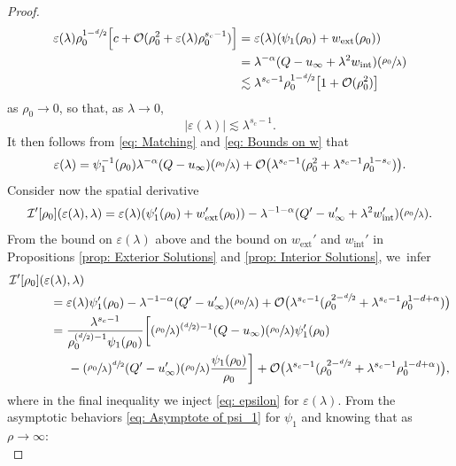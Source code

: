 \documentclass[10pt]{amsart}
\newcommand{\Psfrac}[2]{(\sfrac{#1}{#2})}
\theoremstyle{plain}
\theoremstyle{definition}
\DeclareMathOperator{\exterior}{ext}
\DeclareMathOperator{\interior}{int}
\begin{document}
\begin{proof}
\[
\begin{aligned}
\varepsilon(\lambda)\rho_0^{1-\sfrac{d}{2}}\Big[c+\mathcal O(\rho_0^2+\varepsilon(\lambda)\rho_0^{s_c-1})\Big]&= \varepsilon(\lambda)(\psi_1(\rho_0)+w_{\exterior}(\rho_0))\\
&=\lambda^{-\alpha}(Q-u_\infty+\lambda^2w_{\interior})(\sfrac{\rho_0}{\lambda})\\
&\lesssim \lambda^{s_c-1}\rho_0^{1-\sfrac{d}{2}}\big[1+\mathcal O(\rho_0^2)\big]
\end{aligned}
\]
as $\rho_0\to 0$, so that, as $\lambda\to 0$,
\[
|\varepsilon (\lambda)|\lesssim \lambda^{s_c-1}.
\]
It then follows from \eqref{eq: Matching} and \eqref{eq: Bounds on w} that
\begin{equation}
\label{eq: epsilon}
\varepsilon (\lambda) = \psi_1^{-1}(\rho_0)\lambda^{-\alpha}(Q-u_\infty )(\sfrac{\rho_0}{\lambda})+\mathcal O\big(\lambda^{s_c-1}(\rho_0^2+\lambda^{s_c-1}\rho_0^{1-s_c})\big).
\end{equation}
Consider now the spatial derivative
\[
\mathcal I'[\rho_0](\varepsilon(\lambda),\lambda)= \varepsilon(\lambda)(\psi_1'(\rho_0)+w_{\exterior}'(\rho_0))-\lambda^{-1-\alpha}(Q'-u_\infty'+\lambda^2w_{\interior}')(\sfrac{\rho_0}{\lambda}).
\]
From the bound on $\varepsilon(\lambda)$ above and the bound on $w_{\exterior}'$ and $w_{\interior}'$ in Propositions \ref{prop: Exterior Solutions} and \ref{prop: Interior Solutions}, we~infer
\[
\begin{aligned}
\mathcal I'[\rho_0](\varepsilon&(\lambda),\lambda)\\
&=\varepsilon(\lambda)\psi_1'(\rho_0)-\lambda^{-1-\alpha}(Q'-u_\infty')(\sfrac{\rho_0}{\lambda})+\mathcal O\big(\lambda^{s_c-1}(\rho_0^{2-\sfrac{d}{2}}+\lambda^{s_c-1}\rho_0^{1-d+\alpha})\big)\\
&=\frac{\lambda^{s_c-1}}{\rho_0^{\Psfrac{d}{2}-1}\psi_1(\rho_0)}\bigg[(\sfrac{\rho_0}{\lambda})^{\Psfrac{d}{2}-1}(Q-u_\infty)(\sfrac{\rho_0}{\lambda})\psi_1'(\rho_0)\\
&\hspace*{.5cm}-(\sfrac{\rho_0}{\lambda})^{\sfrac{d}{2}}(Q'-u_\infty')(\sfrac{\rho_0}{\lambda})\frac{\psi_1(\rho_0)}{\rho_0}\bigg]
+ \mathcal O\big(\lambda^{s_c-1}(\rho_0^{2-\sfrac{d}{2}}+\lambda^{s_c-1}\rho_0^{1-d+\alpha})\big),
\end{aligned}
\]
where in the final inequality we inject \eqref{eq: epsilon} for $\varepsilon(\lambda)$. From the asymptotic behaviors \eqref{eq: Asymptote of psi_1} for $\psi_1$ and knowing that as $\rho\to\infty$:
\begin{equation}

\end{equation}
\end{proof}
\end{document}
